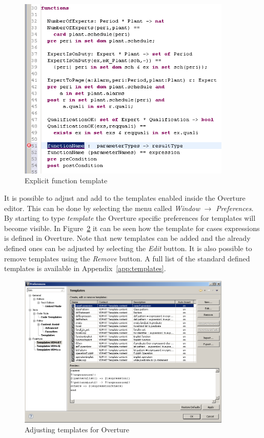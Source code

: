 \documentclass{overturerepsec}
\begin{document}
\begin{figure}
\begin{center}
\includegraphics[width=4in]{figures/FunctionTemplate}
\caption{Explicit function template}
\label{fig:functionTemplate}
\end{center}
\end{figure}

It is possible to adjust and add to the templates enabled inside the
Overture editor. This can be done by selecting the menu called
\emph{Window} $\rightarrow$ \emph{Preferences}. By starting to type
\emph{template} the Overture specific preferences for templates will
become visible. In Figure~\ref{fig:Templatepreferences} it can be seen
how the template for cases expressions is defined in Overture. Note
that new templates can be added and the already defined ones can be
adjusted by selecting the \emph{Edit} button. It is also possible to
remove templates using the \emph{Remove} button. A full list of the
standard defined templates is available in Appendix~\ref{app:templates}.

\begin{figure}
\begin{center}
\includegraphics[width=4in]{screendumps/templatesRT}
\caption{Adjusting templates for Overture}
\label{fig:Templatepreferences}
\end{center}
\end{figure}
\end{document}
